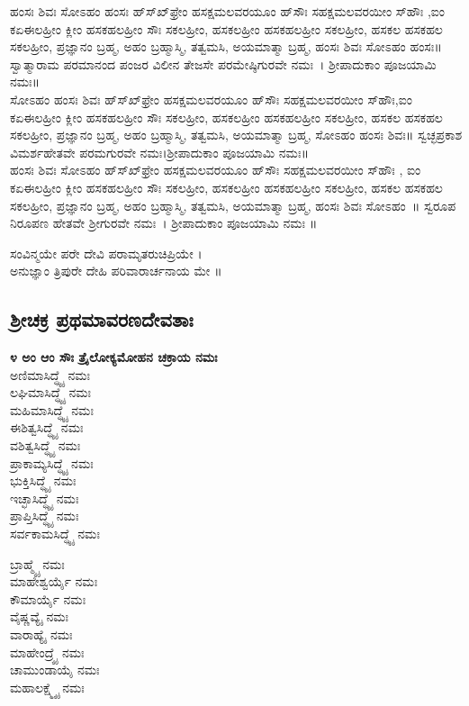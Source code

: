 ಹಂಸಃ ಶಿವಃ ಸೋಽಹಂ ಹಂಸಃ ಹ್‌ಸ್‌ಖ್‌ಫ್ರೇಂ ಹಸಕ್ಷಮಲವರಯೂಂ ಹ್‌ಸೌಃ ಸಹಕ್ಷಮಲವರಯೀಂ ಸ್‌ಹೌಃ ,ಐಂ ಕಏಈಲಹ್ರೀಂ ಕ್ಲೀಂ ಹಸಕಹಲಹ್ರೀಂ ಸೌಃ ಸಕಲಹ್ರೀಂ, ಹಸಕಲಹ್ರೀಂ ಹಸಕಹಲಹ್ರೀಂ ಸಕಲಹ್ರೀಂ, ಹಸಕಲ ಹಸಕಹಲ ಸಕಲಹ್ರೀಂ, ಪ್ರಜ್ಞಾನಂ ಬ್ರಹ್ಮ, ಅಹಂ ಬ್ರಹ್ಮಾಸ್ಮಿ, ತತ್ವಮಸಿ, ಅಯಮಾತ್ಮಾ ಬ್ರಹ್ಮ, ಹಂಸಃ ಶಿವಃ ಸೋಽಹಂ ಹಂಸಃ॥ ಸ್ವಾತ್ಮಾರಾಮ ಪರಮಾನಂದ ಪಂಜರ ವಿಲೀನ ತೇಜಸೇ ಪರಮೇಷ್ಠಿಗುರವೇ ನಮಃ~। ಶ್ರೀಪಾದುಕಾಂ ಪೂಜಯಾಮಿ ನಮಃ॥\\
 ಸೋಽಹಂ ಹಂಸಃ ಶಿವಃ ಹ್‌ಸ್‌ಖ್‌ಫ್ರೇಂ ಹಸಕ್ಷಮಲವರಯೂಂ ಹ್‌ಸೌಃ ಸಹಕ್ಷಮಲವರಯೀಂ ಸ್‌ಹೌಃ,ಐಂ ಕಏಈಲಹ್ರೀಂ ಕ್ಲೀಂ ಹಸಕಹಲಹ್ರೀಂ ಸೌಃ ಸಕಲಹ್ರೀಂ, ಹಸಕಲಹ್ರೀಂ ಹಸಕಹಲಹ್ರೀಂ ಸಕಲಹ್ರೀಂ, ಹಸಕಲ ಹಸಕಹಲ ಸಕಲಹ್ರೀಂ, ಪ್ರಜ್ಞಾನಂ ಬ್ರಹ್ಮ, ಅಹಂ ಬ್ರಹ್ಮಾಸ್ಮಿ, ತತ್ವಮಸಿ, ಅಯಮಾತ್ಮಾ ಬ್ರಹ್ಮ, ಸೋಽಹಂ ಹಂಸಃ ಶಿವಃ॥ ಸ್ವಚ್ಛಪ್ರಕಾಶ ವಿಮರ್ಶಹೇತವೇ ಪರಮಗುರವೇ ನಮಃ।ಶ್ರೀಪಾದುಕಾಂ ಪೂಜಯಾಮಿ ನಮಃ॥\\
 ಹಂಸಃ ಶಿವಃ ಸೋಽಹಂ ಹ್‌ಸ್‌ಖ್‌ಫ್ರೇಂ ಹಸಕ್ಷಮಲವರಯೂಂ ಹ್‌ಸೌಃ ಸಹಕ್ಷಮಲವರಯೀಂ ಸ್‌ಹೌಃ , ಐಂ ಕಏಈಲಹ್ರೀಂ ಕ್ಲೀಂ ಹಸಕಹಲಹ್ರೀಂ ಸೌಃ ಸಕಲಹ್ರೀಂ, ಹಸಕಲಹ್ರೀಂ ಹಸಕಹಲಹ್ರೀಂ ಸಕಲಹ್ರೀಂ, ಹಸಕಲ ಹಸಕಹಲ ಸಕಲಹ್ರೀಂ, ಪ್ರಜ್ಞಾನಂ ಬ್ರಹ್ಮ, ಅಹಂ ಬ್ರಹ್ಮಾಸ್ಮಿ, ತತ್ವಮಸಿ, ಅಯಮಾತ್ಮಾ ಬ್ರಹ್ಮ, ಹಂಸಃ ಶಿವಃ ಸೋಽಹಂ~॥ ಸ್ವರೂಪ ನಿರೂಪಣ ಹೇತವೇ ಶ್ರೀಗುರವೇ ನಮಃ~। ಶ್ರೀಪಾದುಕಾಂ ಪೂಜಯಾಮಿ ನಮಃ ॥

ಸಂವಿನ್ಮಯೇ ಪರೇ ದೇವಿ ಪರಾಮೃತರುಚಿಪ್ರಿಯೇ ।\\
 ಅನುಜ್ಞಾಂ ತ್ರಿಪುರೇ ದೇಹಿ ಪರಿವಾರಾರ್ಚನಾಯ ಮೇ ॥
 
\subsection{ಶ್ರೀಚಕ್ರ ಪ್ರಥಮಾವರಣದೇವತಾಃ}
{\bfseries ೪ ಅಂ ಆಂ ಸೌಃ ತ್ರೈಲೋಕ್ಯಮೋಹನ ಚಕ್ರಾಯ ನಮಃ }\\
 ಅಣಿಮಾಸಿದ್ಧ್ಯೈ ನಮಃ\\
 ಲಘಿಮಾಸಿದ್ಧ್ಯೈ ನಮಃ\\
 ಮಹಿಮಾಸಿದ್ಧ್ಯೈ ನಮಃ\\
 ಈಶಿತ್ವಸಿದ್ಧ್ಯೈ ನಮಃ\\
 ವಶಿತ್ವಸಿದ್ಧ್ಯೈ ನಮಃ\\
 ಪ್ರಾಕಾಮ್ಯಸಿದ್ಧ್ಯೈ ನಮಃ\\
 ಭುಕ್ತಿಸಿದ್ಧ್ಯೈ ನಮಃ\\
 ಇಚ್ಛಾಸಿದ್ಧ್ಯೈ ನಮಃ\\
 ಪ್ರಾಪ್ತಿಸಿದ್ಧ್ಯೈ ನಮಃ\\
 ಸರ್ವಕಾಮಸಿದ್ಧ್ಯೈ ನಮಃ

 ಬ್ರಾಹ್ಮ್ಯೈ ನಮಃ\\
 ಮಾಹೇಶ್ವರ್ಯೈ ನಮಃ\\
 ಕೌಮಾರ್ಯೈ ನಮಃ\\
 ವೈಷ್ಣವ್ಯೈ ನಮಃ\\
 ವಾರಾಹ್ಯೈ ನಮಃ\\
 ಮಾಹೇಂದ್ರ್ಯೈ ನಮಃ\\
 ಚಾಮುಂಡಾಯೈ ನಮಃ\\
 ಮಹಾಲಕ್ಷ್ಮ್ಯೈ ನಮಃ

